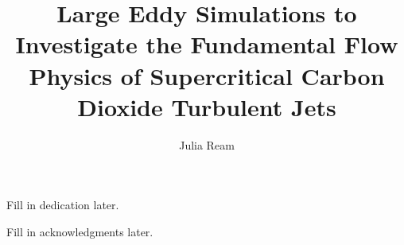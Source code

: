 \documentclass[11pt,expanded,copyright]{fsuthesis}
\title{Large Eddy Simulations to Investigate the Fundamental Flow Physics of Supercritical Carbon Dioxide Turbulent Jets}
\author{Julia Ream}
\begin{document}
\frontmatter
\maketitle
\makecommitteepage

\begin{dedication}
Fill in dedication later.
\end{dedication}

\begin{acknowledgments}
Fill in acknowledgments later.
\end{acknowledgments}

\tableofcontents
\listoftables
\listoffigures


\end{document}
